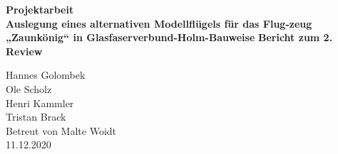 \begin{center}
\begin{large}
	\textbf{Projektarbeit}\\

	\textbf{Auslegung eines alternativen Modellflügels für das Flug-zeug „Zaunkönig“ in Glasfaserverbund-Holm-Bauweise}
	\textbf{Bericht zum 2. Review}\\
\end{large}

Hannes Golombek\\
Ole Scholz\\
Henri Kammler\\
Tristan Brack\\
Betreut von Malte Woidt\\
11.12.2020\\
\end{center}

